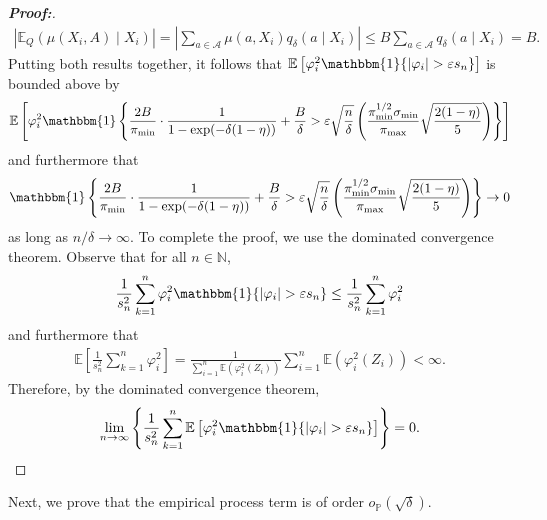\documentclass[11pt,twoside]{article}
\theoremstyle{definition}
\theoremstyle{remark}
\begin{document}
\begin{proof}[\textbf{Proof:}]
\begin{align*}
    \left|\mathbb{E}_Q(\mu(X_i, A) \mid X_i) \right| =  \left|\sum_{a \in \mathcal{A}} \mu(a, X_i) q_\delta(a \mid X_i) \right| \leq B \sum_{a \in \mathcal{A}} q_\delta(a \mid X_i) = B.
\end{align*}
Putting both results together, it follows that $\mathbb{E}\left[
    \varphi^2_i \mathbbm{1}\{|\varphi_i|>\varepsilon s_n\}
    \right]$ is bounded above by
\begin{align*}
     \mathbb{E}\left[
    \varphi^2_i \mathbbm{1}\left\{\frac{2B}{\pi_{\min}} \cdot \frac{1}{1 - \exp(-\delta(1 - \eta))} + \frac{B}{\delta} > \varepsilon \sqrt{\frac{n}{\delta}} \left(\frac{\pi^{1/2}_{\min} \sigma_{\min}}{\pi_{\max}} \sqrt{\frac{2(1 - \eta)}{5}} \right)\right\} 
    \right]
\end{align*}
and furthermore that
\begin{align*}
     \mathbbm{1}\left\{\frac{2B}{\pi_{\min}} \cdot \frac{1}{1 - \exp(-\delta(1 - \eta))} + \frac{B}{\delta} > \varepsilon \sqrt{\frac{n}{\delta}} \left(\frac{\pi^{1/2}_{\min} \sigma_{\min}}{\pi_{\max}} \sqrt{\frac{2(1 - \eta)}{5}} \right)\right\}  \to 0
\end{align*}
as long as $n / \delta \to \infty$. To complete the proof, we use the dominated convergence theorem. Observe that for all $n \in \mathbb{N}$,
\begin{align*}
    \frac{1}{s_n^2}\sum_{k=1}^n
    \varphi^2_i \mathbbm{1}\{|\varphi_i|>\varepsilon s_n\}
     \leq  \frac{1}{s_n^2}\sum_{k=1}^n
    \varphi^2_i
\end{align*}
and furthermore that
\begin{align*}
     \mathbb{E}\left[\frac{1}{s_n^2}\sum_{k=1}^n
    \varphi^2_i \right] = \frac{1}{\sum^n_{i=1} \mathbb{E}(\varphi^2_i(Z_i))} \sum^n_{i=1} \mathbb{E}(\varphi^2_i(Z_i)) < \infty.
\end{align*}
Therefore, by the dominated convergence theorem,
\begin{align*}
 \underset{n \to \infty}{\text{lim}} \left\{ \frac{1}{s_n^2}\sum_{k=1}^n\mathbb{E}\left[
    \varphi^2_i  \mathbbm{1}\{|\varphi_i|>\varepsilon s_n\}
    \right] \right\} = 0.
\end{align*}
\end{proof}

Next, we prove that the empirical process term is of order $o_\mathbb{P}(\sqrt{\delta})$.
\end{document}
